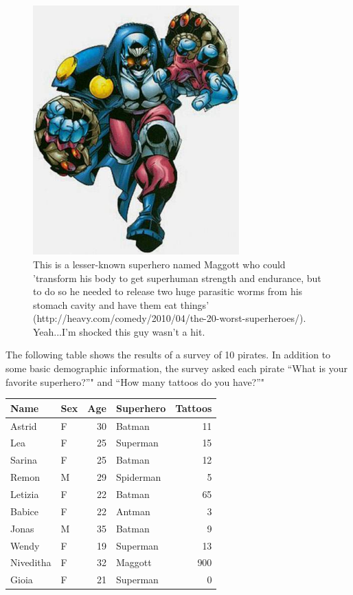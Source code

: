 \documentclass[]{book}
\theoremstyle{definition}
\theoremstyle{definition}
\theoremstyle{remark}
\begin{document}
\begin{figure}

{\centering \includegraphics[width=300px]{images/maggot} 

}

\caption{This is a lesser-known superhero named Maggott who could 'transform his body to get superhuman strength and endurance, but to do so he needed to release two huge parasitic worms from his stomach cavity and have them eat things' (http://heavy.com/comedy/2010/04/the-20-worst-superheroes/). Yeah...I'm shocked this guy wasn't a hit.}\label{fig:unnamed-chunk-210}
\end{figure}

The following table shows the results of a survey of 10 pirates. In
addition to some basic demographic information, the survey asked each
pirate ``What is your favorite superhero?''" and ``How many tattoos do
you have?''"

\begin{tabular}{l|l|r|l|r}
\hline
Name & Sex & Age & Superhero & Tattoos\\
\hline
Astrid & F & 30 & Batman & 11\\
\hline
Lea & F & 25 & Superman & 15\\
\hline
Sarina & F & 25 & Batman & 12\\
\hline
Remon & M & 29 & Spiderman & 5\\
\hline
Letizia & F & 22 & Batman & 65\\
\hline
Babice & F & 22 & Antman & 3\\
\hline
Jonas & M & 35 & Batman & 9\\
\hline
Wendy & F & 19 & Superman & 13\\
\hline
Niveditha & F & 32 & Maggott & 900\\
\hline
Gioia & F & 21 & Superman & 0\\
\hline
\end{tabular}
\end{document}
